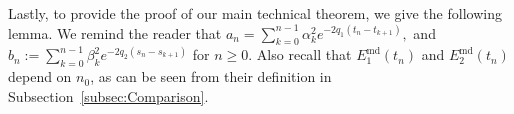 \documentclass[usenames,dvipsnames,final,12pt]{colt2018} %
\newcommand{\st}{\alpha}
\newcommand{\lt}{q_1}
\newcommand{\et}{\epsilon_1}
\newcommand{\Et}{E_1}
\newcommand{\Kt}{K_1}
\newcommand{\EtM}{\Et^{\md}}
\newcommand{\Lt}[1]{L^{\theta}_{#1}}
\newcommand{\sw}{\beta}
\newcommand{\lz}{q_2}
\newcommand{\ez}{\epsilon_2}
\newcommand{\Ez}{E_2}
\newcommand{\Kz}{K_2}
\newcommand{\EzM}{\Ez^{\md}}
\newcommand{\aftE}{\text{after}}
\newcommand{\midE}{\text{mid}}
\newcommand{\md}{\text{md}}
\newcommand{\tI}[1]{t_{#1}}
\newcommand{\sI}[1]{s_{#1}}
\newcommand{\cE}{\mathcal{E}}
\newcommand{\norm}[1]{\left\lVert#1\right\rVert}
\newcommand{\gal}[1]{#1}
\begin{document}
%


Lastly, to provide the proof of our main technical theorem, we give the following lemma.
%
{
We remind the reader that $a_n = \sum_{k = 0}^{n - 1} \st_k^{2} e^{ -2 \lt (\tI{n} - \tI{k + 1})},$
and $b_n := \sum_{k = 0}^{n - 1} \sw_k^{2} e^{ -2 \lz (\sI{n} - \sI{k + 1})}$ for $n \geq 0$.
Also recall that $\EtM(\tI{n})$ and $\EzM(\tI{n})$ depend on $n_0$, as can be seen from their definition in \gal{Subsection~\ref{subsec:Comparison}}.
}
\end{document}
